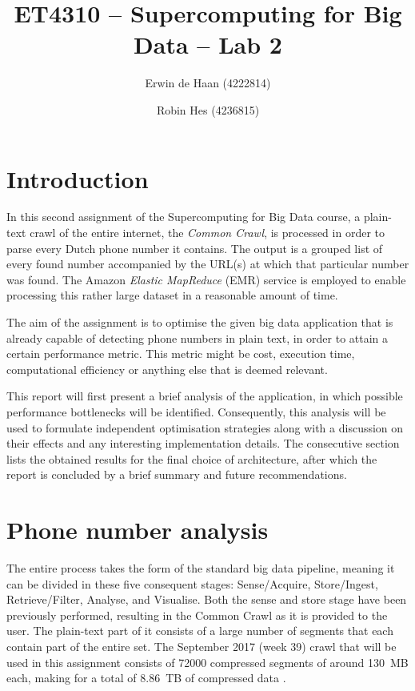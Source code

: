\documentclass{article}
\title{ET4310 -- Supercomputing for Big Data -- Lab 2}
\author{Erwin de Haan (4222814) \and Robin Hes (4236815)}
\begin{document}
\maketitle
\section{Introduction}
In this second assignment of the Supercomputing for Big Data course, a plain-text crawl of the entire internet, the \emph{Common Crawl}, is processed in order to parse every Dutch phone number it contains.
The output is a grouped list of every found number accompanied by the URL(s) at which that particular number was found.
The Amazon \emph{Elastic MapReduce} (EMR) service is employed to enable processing this rather large dataset in a reasonable amount of time.

The aim of the assignment is to optimise the given big data application that is already capable of detecting phone numbers in plain text, in order to attain a certain performance metric.
This metric might be cost, execution time, computational efficiency or anything else that is deemed relevant.

This report will first present a brief analysis of the application, in which possible performance bottlenecks will be identified.
Consequently, this analysis will be used to formulate independent optimisation strategies along with a discussion on their effects and any interesting implementation details.
The consecutive section lists the obtained results for the final choice of architecture, after which the report is concluded by a brief summary and future recommendations.

\section{Phone number analysis}
The entire process takes the form of the standard big data pipeline, meaning it can be divided in these five consequent stages: Sense/Acquire, Store/Ingest, Retrieve/Filter, Analyse, and Visualise.
Both the sense and store stage have been previously performed, resulting in the Common Crawl as it is provided to the user.
The plain-text part of it consists of a large number of segments that each contain part of the entire set.
The September 2017 (week 39) crawl that will be used in this assignment consists of \num{72000} compressed segments of around \SI{130}{MB} each, making for a total of \SI{8.86}{TB} of compressed data \cite{commoncrawl2017september}.
\end{document}
